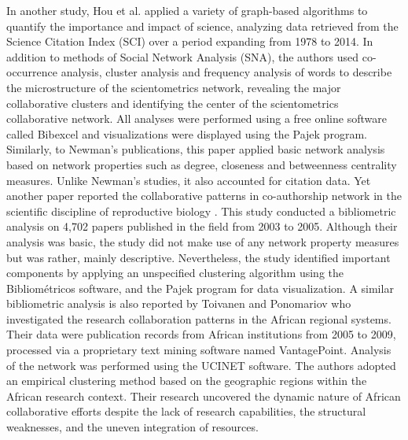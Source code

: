 In another study, Hou et al. \cite{hou_structure_2008} applied a variety of graph-based algorithms to quantify the importance and impact of science, analyzing data retrieved from the Science Citation Index (SCI) over a period expanding from 1978 to 2014. In addition to methods of Social Network Analysis (SNA), the authors used co-occurrence analysis, cluster analysis and frequency analysis of words to describe the microstructure of the scientometrics network, revealing the major collaborative clusters and identifying the center of the scientometrics collaborative network. All analyses were performed using a free online software called Bibexcel and visualizations were displayed using the Pajek program. Similarly, to Newman’s publications, this paper applied basic network analysis based on network properties such as degree, closeness and betweenness centrality measures. Unlike Newman’s studies, it also accounted for citation data. Yet another paper reported the collaborative patterns in co-authorship network in the scientific discipline of reproductive biology \cite{gonzalez-alcaide_coauthorship_2008}. This study conducted a bibliometric analysis on 4,702 papers published in the field from 2003 to 2005. Although their analysis was basic, the study did not make use of any network property measures but was rather, mainly descriptive. Nevertheless, the study identified important components by applying an unspecified clustering algorithm using the Bibliom\'etricos software, and the Pajek program for data visualization. A similar bibliometric analysis is also reported by Toivanen and Ponomariov \cite{toivanen_african_2011} who investigated the research collaboration patterns in the African regional systems. Their data were publication records from African institutions from 2005 to 2009, processed via a proprietary text mining software named VantagePoint. Analysis of the network was performed using the UCINET software. The authors adopted an empirical clustering method based on the geographic regions within the African research context. Their research uncovered the dynamic nature of African collaborative efforts despite the lack of research capabilities, the structural weaknesses, and the uneven integration of resources. \\%
